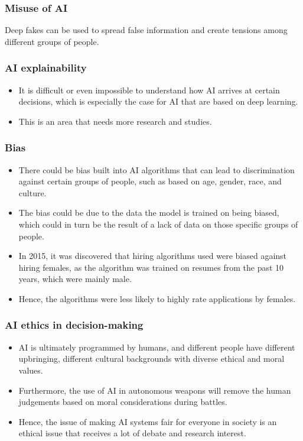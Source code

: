\documentclass[11pt]{article}
\begin{document}
\subsubsection{Misuse of AI}
\label{sec:org8841ca0}
Deep fakes can be used to spread false information and create tensions among different groups of people.

\subsubsection{AI explainability}
\label{sec:orge69327b}
\begin{itemize}
\item It is difficult or even impossible to understand how AI arrives at certain decisions, which is especially the case for AI that are based on deep learning.
\item This is an area that needs more research and studies.
\end{itemize}

\subsubsection{Bias}
\label{sec:org31a2306}
\begin{itemize}
\item There could be bias built into AI algorithms that can lead to discrimination against certain groups of people, such as based on age, gender, race, and culture.
\item The bias could be due to the data the model is trained on being biased, which could in turn be the result of a lack of data on those specific groups of people.
\item In 2015, it was discovered that hiring algorithms used were biased against hiring females, as the algorithm was trained on resumes from the past 10 years, which were mainly male.
\item Hence, the algorithms were less likely to highly rate applications by females.
\end{itemize}

\subsubsection{AI ethics in decision-making}
\label{sec:org48d9cdf}
\begin{itemize}
\item AI is ultimately programmed by humans, and different people have different upbringing, different cultural backgrounds with diverse ethical and moral values.
\item Furthermore, the use of AI in autonomous weapons will remove the human judgements based on moral considerations during battles.
\item Hence, the issue of making AI systems fair for everyone in society is an ethical issue that receives a lot of debate and research interest.
\end{itemize}
\end{document}

